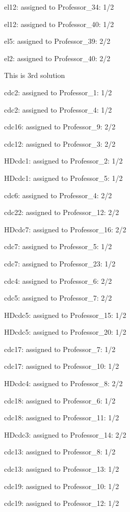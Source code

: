 \documentclass{article} %
\begin{document}
\noindent el12: assigned to Professor\_34: 1/2

\noindent el12: assigned to Professor\_40: 1/2

\noindent el5: assigned to Professor\_39: 2/2

\noindent el2: assigned to Professor\_40: 2/2

\noindent 

\noindent  This is 3rd solution

\noindent cdc2: assigned to Professor\_1: 1/2

\noindent cdc2: assigned to Professor\_4: 1/2

\noindent cdc16: assigned to Professor\_9: 2/2

\noindent cdc12: assigned to Professor\_3: 2/2

\noindent HDcdc1: assigned to Professor\_2: 1/2

\noindent HDcdc1: assigned to Professor\_5: 1/2

\noindent cdc6: assigned to Professor\_4: 2/2

\noindent cdc22: assigned to Professor\_12: 2/2

\noindent HDcdc7: assigned to Professor\_16: 2/2

\noindent cdc7: assigned to Professor\_5: 1/2

\noindent cdc7: assigned to Professor\_23: 1/2

\noindent cdc4: assigned to Professor\_6: 2/2

\noindent cdc5: assigned to Professor\_7: 2/2

\noindent HDcdc5: assigned to Professor\_15: 1/2

\noindent HDcdc5: assigned to Professor\_20: 1/2

\noindent cdc17: assigned to Professor\_7: 1/2

\noindent cdc17: assigned to Professor\_10: 1/2

\noindent HDcdc4: assigned to Professor\_8: 2/2

\noindent cdc18: assigned to Professor\_6: 1/2

\noindent cdc18: assigned to Professor\_11: 1/2

\noindent HDcdc3: assigned to Professor\_14: 2/2

\noindent cdc13: assigned to Professor\_8: 1/2

\noindent cdc13: assigned to Professor\_13: 1/2

\noindent cdc19: assigned to Professor\_10: 1/2

\noindent cdc19: assigned to Professor\_12: 1/2
\end{document}
